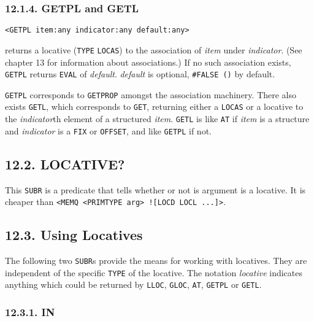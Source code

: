 \documentclass[a4paper,]{article}
\begin{document}
\subsubsection{12.1.4. GETPL and GETL}\label{getpl-and-getl}

\begin{verbatim}
<GETPL item:any indicator:any default:any>
\end{verbatim}

 returns a locative (\texttt{TYPE} \texttt{LOCAS}) to the
association of \emph{item} under \emph{indicator}. (See chapter 13 for information about associations.) If no such
association exists, \texttt{GETPL} returns \texttt{EVAL} of \emph{default}. \emph{default} is optional,
\texttt{\#FALSE\ ()} by default.

\texttt{GETPL} corresponds to \texttt{GETPROP} amongst the association machinery. There also exists
\texttt{GETL}, which corresponds to \texttt{GET}, returning either a \texttt{LOCAS} or a
locative to the \emph{indicator}th element of a structured \emph{item}. \texttt{GETL} is like \texttt{AT} if \emph{item} is
a structure and \emph{indicator} is a \texttt{FIX} or \texttt{OFFSET}, and like \texttt{GETPL} if not.

\subsection{12.2. LOCATIVE?}\label{locative}

This \texttt{SUBR} is a predicate that tells whether or not is argument is a locative. It
is cheaper than
\texttt{\textless{}MEMQ\ \textless{}PRIMTYPE\ arg\textgreater{}\ \textquotesingle{}!{[}LOCD\ LOCL\ ...{]}\textgreater{}}.

\subsection{12.3. Using Locatives}\label{using-locatives}

The following two \texttt{SUBR}s provide the means for working with locatives. They are independent of the specific
\texttt{TYPE} of the locative. The notation \emph{locative} indicates anything which could be returned by \texttt{LLOC},
\texttt{GLOC}, \texttt{AT}, \texttt{GETPL} or \texttt{GETL}.

\subsubsection{12.3.1. IN}\label{in}
\end{document}
